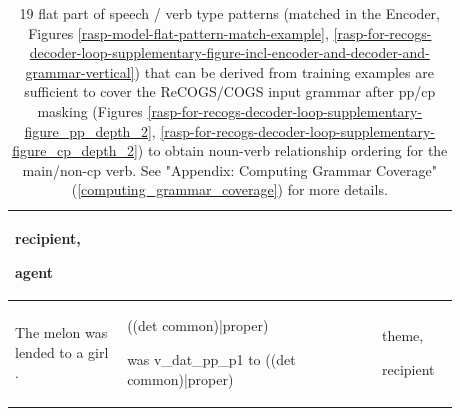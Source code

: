 \documentclass[11pt]{article}
\begin{document}
\begin{table}
\begin{tabular}{p{0.225\linewidth} p{0.50\linewidth} p{0.15\linewidth}}
\begin{tiny}
recipient,

agent\end{tiny} \\
\hline
\begin{tiny}The melon was lended to a girl .\end{tiny} & \begin{tiny}((det common)|proper)

was v\_dat\_pp\_p1 to ((det common)|proper)\end{tiny} & \begin{tiny}theme,

recipient\end{tiny} \\
\hline
\end{tabular}
\caption{19 flat part of speech / verb type patterns (matched in the Encoder, Figures \ref{rasp-model-flat-pattern-match-example}, \ref{rasp-for-recogs-decoder-loop-supplementary-figure-incl-encoder-and-decoder-and-grammar-vertical}) that can be derived from training examples are sufficient to cover the ReCOGS/COGS input grammar after pp/cp masking (Figures \ref{rasp-for-recogs-decoder-loop-supplementary-figure_pp_depth_2}, \ref{rasp-for-recogs-decoder-loop-supplementary-figure_cp_depth_2}) to obtain noun-verb relationship ordering for the main/non-cp verb. See "Appendix: Computing Grammar Coverage" (\ref{computing_grammar_coverage}) for more details.}
\label{RASP-model-flat-patterns-after-masking-to-nv-relationships-table}
\end{table}
\end{document}
